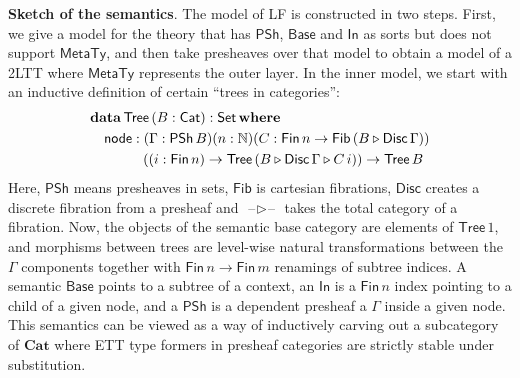 \documentclass{easychair}
\newcommand{\msf}[1]{{\mathsf{#1}}}
\newcommand{\mbf}[1]{{\mathbf{#1}}}
\newcommand{\mbb}[1]{\mathbb{#1}}
\newcommand{\ext}{\triangleright}
\newcommand{\blank}{{\mathord{\hspace{1pt}\text{--}\hspace{1pt}}}}
\newcommand{\MetaTy}{\msf{MetaTy}}
\newcommand{\Base}{\msf{Base}}
\newcommand{\PSh}{\msf{PSh}}
\newcommand{\Cat}{\msf{Cat}}
\newcommand{\In}{\msf{In}}
\newcommand{\Fib}{\msf{Fib}}
\newcommand{\Fin}{\msf{Fin}}
\newcommand{\Tree}{\msf{Tree}}
\newcommand{\Disc}{\msf{Disc}}
\begin{document}
\noindent \textbf{Sketch of the semantics}. The model of LF is constructed in
two steps. First, we give a model for the theory that has $\PSh$, $\Base$ and
$\In$ as sorts but does not support $\MetaTy$, and then take presheaves over
that model to obtain a model of a 2LTT where $\MetaTy$ represents the outer
layer. In the inner model, we start with an inductive definition of certain
``trees in categories'':
\begin{alignat*}{3}
  & \mbf{data}\,\Tree\,(B : \Cat) : \msf{Set}\,\mbf{where}\\
  & \hspace{1em} \msf{node} : (\Gamma : \PSh\,B)(n : \mbb{N})(C : \Fin\,n \to \Fib\,(B \ext \Disc\,\Gamma))\\
  & \hspace{3.8em} ((i : \Fin\,n) \to \Tree\,(B \ext \Disc\,\Gamma \ext C\,i)) \to \Tree\,B
\end{alignat*}
Here, $\PSh$ means presheaves in sets, $\Fib$ is cartesian fibrations, $\Disc$
creates a discrete fibration from a presheaf and $\blank\!\ext\!\blank$ takes
the total category of a fibration. Now, the objects of the semantic base
category are elements of $\Tree\,1$, and morphisms between trees are level-wise
natural transformations between the $\Gamma$ components together with $\Fin\,n
\to \Fin\,m$ renamings of subtree indices. A semantic $\Base$ points to a
subtree of a context, an $\In$ is a $\Fin\,n$ index pointing to a child of a
given node, and a $\PSh$ is a dependent presheaf a $\Gamma$ inside a given node.
This semantics can be viewed as a way of inductively carving out a subcategory
of $\mbf{Cat}$ where ETT type formers in presheaf categories are strictly stable
under substitution.



\end{document}
